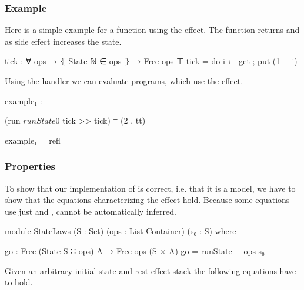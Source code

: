 \subsubsection{Example}

Here is a simple example for a function using the 
effect.
The function  returns  and
as side effect increases the state.

\begin{code}
tick : ∀ {ops} → ⦃ State ℕ ∈ ops ⦄ → Free ops ⊤
tick = do i ← get ; put (1 + i)
\end{code}
Using the  handler we can evaluate programs, which use
the  effect.

\begin{center}
\begin{code}
example₁ :
\end{code}
\begin{code}[inline]
 (run $ runState 0 $ tick >> tick) ≡ (2 , tt)
\end{code}
\begin{code}
example₁ = refl
\end{code}
\end{center}


\subsubsection{Properties}

To show that our implementation of  is correct, i.e. that it
is a model, we have to show that the equations characterizing the effect hold.
Because some equations use just  and ,
 cannot be automatically inferred.

\begin{code}
module StateLaws (S : Set) (ops : List Container) (s₀ : S) where
\end{code}
\begin{code}
  go : Free (State S ∷ ops) A → Free ops (S × A)
  go = runState {_} {ops} s₀
\end{code}
Given an arbitrary initial state  and rest effect stack
 the following equations have to hold.

